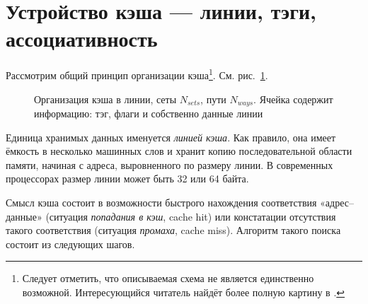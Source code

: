 \section{Устройство кэша — линии, тэги, ассоциативность}

Рассмотрим общий принцип организации кэша\footnote{Следует отметить, что описываемая схема не является единственно возможной. Интересующийся читатель найдёт более полную картину в \cite{hennessy-patterson}.}. См. рис.~\ref{fig:cache}.

\begin{figure}[htb]
    \centering
    \caption[Организация кэша в линии, сеты, пути]{Организация кэша в линии, сеты $N_{sets}$, пути $N_{ways}$. Ячейка содержит информацию: тэг, флаги и собственно данные линии}
    \label{fig:cache}
\end{figure}


Единица хранимых данных именуется \textit{линией кэша}. Как правило, она имеет ёмкость в несколько машинных слов и хранит копию последовательной области памяти, начиная с адреса, выровненного по размеру линии. В современных процессорах размер линии может быть 32 или 64 байта. 

Смысл кэша состоит в возможности быстрого нахождения соответствия «адрес--данные» (ситуация \textit{попадания в кэш}, \abbr cache hit) или констатации отсутствия такого соответствия (ситуация \textit{промаха}, \abbr cache miss). Алгоритм такого поиска состоит из следующих шагов.

